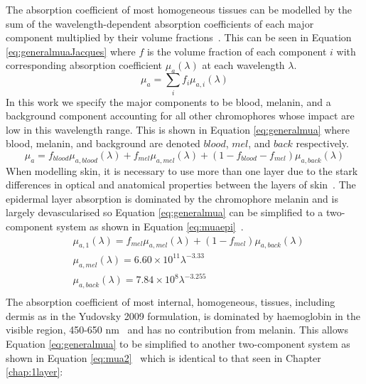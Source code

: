 The absorption coefficient of most homogeneous tissues can be modelled by the sum of the wavelength-dependent absorption coefficients of each major component multiplied by their volume fractions~\citep{Jacques2013}. 
This can be seen in Equation \eqref{eq:generalmuaJacques} where $f$ is the volume fraction of each component $i$ with corresponding absorption coefficient $\mu_a(\lambda)$ at each wavelength $\lambda$. 
\begin{equation}
    \mu_a = \sum_i{f_i\mu_{a, i}(\lambda)}
    \label{eq:generalmuaJacques}
\end{equation}
In this work we specify the major components to be blood, melanin, and a background component accounting for all other chromophores whose impact are low in this wavelength range. This is shown in Equation \eqref{eq:generalmua} where blood, melanin, and background are denoted $blood$, $mel$, and $back$ respectively.
\begin{equation}
    \mu_a = f_{blood}\mu_{a, blood}(\lambda) + f_{mel}\mu_{a, mel}(\lambda) + (1 - f_{blood} - f_{mel})\mu_{a, back}(\lambda)
    \label{eq:generalmua}
\end{equation}
When modelling skin, it is necessary to use more than one layer due to the stark differences in optical and anatomical properties between the layers of skin~\citep{Mignon2018}. The epidermal layer absorption is dominated by the chromophore melanin and is largely devascularised so Equation \eqref{eq:generalmua} can be simplified to a two-component system as shown in Equation \eqref{eq:muaepi}~\citep{Yudovsky2009}.
\begin{equation}
\begin{aligned}
    & \mu_{a, 1}(\lambda) = f_{mel}\mu_{a, mel}(\lambda) + (1-f_{mel})\mu_{a, back}(\lambda) \\
    & \mu_{a, mel}(\lambda) = 6.60\times10^{11}\lambda^{-3.33}\\
    & \mu_{a, back}(\lambda) = 7.84\times10^8\lambda^{-3.255}\\
\end{aligned}
\label{eq:muaepi}
\end{equation}
The absorption coefficient of most internal, homogeneous, tissues, including dermis as in the Yudovsky 2009 formulation, is dominated by haemoglobin in the visible region, 450-650 nm~\citep{JacquesAbs} and has no contribution from melanin. This allows Equation \eqref{eq:generalmua} to be simplified to another two-component system as shown in Equation \eqref{eq:mua2}~\citep{Yudovsky2009} which is identical to that seen in Chapter \ref{chap:1layer}: 
